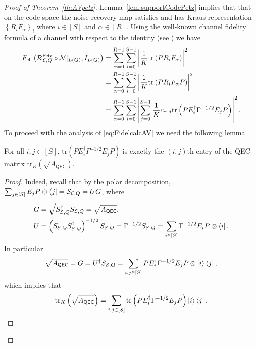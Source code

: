 \documentclass[10pt]{article}
\newcommand{\tr}{\mathrm{tr}}
\newcommand{\abs}[1]{\left|#1\right|}
\newcommand{\p}[1]{\left(#1\right)}
\newcommand{\ppp}[1]{\left\{#1\right\}}
\newcommand{\s}[1]{\mathsf{#1}}
\begin{document}
\begin{proof}[Proof of Theorem~\ref{th:AVpetz}]
     Lemma~\ref{lem:supportCodePetz} implies that that on the code space the noise recovery map satisfies and has Kraus representation $\ppp{R_i F_{\alpha}}_{i}$ where $i\in [S]$ and $\alpha\in [R]$. Using the well-known channel fidelity formula of a channel with respect to the identity (see \cite[eq.~(8)]{barnum2002reversing}) we have 
     \begin{align}
     F_{\mathrm{ch}}\p{\calR_{\calE,Q}^{\s{\s{Petz}}}\circ \calN|_{L(Q)},I_{L(Q)}}&\nonumber=\sum_{\alpha=0}^{R-1}\sum_{i=0}^{S-1}\abs{\frac{1}{K}\tr\p{P R_i F_\alpha }}^2\\
     &\nonumber=\sum_{\alpha=0}^{R-1}\sum_{i=0}^{S-1}\abs{\frac{1}{K}\tr\p{P R_i F_\alpha P }}^2
     \\&=\sum_{\alpha=0}^{R-1}\sum_{i=0}^{S-1}\abs{\sum_{j=0}^{S-1}\frac{1}{K}c_{\alpha,j}\tr\p{P E_i^\dag \Gamma^{-1/2} E_j P }}^2.\label{eq:FidelcalcAV}
     \end{align}
  To proceed with the analysis of \eqref{eq:FidelcalcAV} we need the following lemma.
      \begin{lemma}
        For all $i,j\in [S]$, $\tr\p{P E_i^\dag \Gamma^{-1/2} E_j P }$ is exactly the $(i,j)$th entry of the QEC matrix $\tr_K\p{\sqrt{A_{\s{QEC}}}}$.
      \end{lemma}
       \begin{proof}
           Indeed, recall that by the polar decomposition,  $\sum_{j\in[S]}E_j P \otimes \bra{j}={\cal S}_{{\cal E},Q}=U G$, where 
     \begin{align*}
     G&=\sqrt{S_{\calE,Q}^\dag S_{\calE,Q} }=\sqrt{A_{\s{QEC}}}, \\ U&=\p{S_{\calE,Q}S_{\calE,Q}^\dag}^{-1/2}S_{\calE,Q}=\Gamma^{-1/2}S_{\calE,Q}=\sum_{i\in [S]}\Gamma^{-1/2}E_iP\otimes \bra{i}.
     \end{align*}
     In particular 
     \begin{equation}
         \sqrt{A_{\s{QEC}}}=G=U^\dag S_{\calE,Q}=\sum_{i,j\in [S]}P E_i^\dag \Gamma^{-1/2}E_j P\otimes \ket{i} \bra{j},\label{eq:SqrtQECmatrix}
     \end{equation}
     which implies that 
     \[\tr_K\p{\sqrt{A_{\s{QEC}}}}=\sum_{i,j\in[S]}\tr\p{P E_i^\dag \Gamma^{-1/2}E_j P}  \ket{i} \bra{j}. \qedhere
     \]
       \end{proof}


\end{proof}
\end{document}
